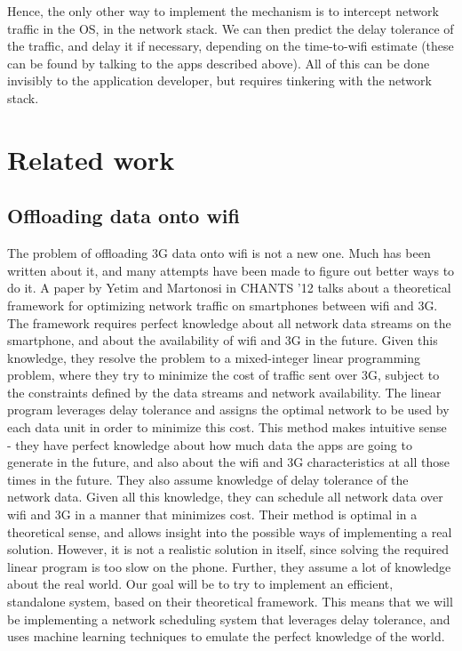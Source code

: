 \documentclass[12pt, fleqn]{article}
\begin{document}
\begin{itemize}
  Hence, the only other way to implement the mechanism is to intercept network 
  traffic in the OS, in the network stack. We can then predict the delay 
  tolerance of the traffic, and delay it if necessary, depending on the 
  time-to-wifi estimate (these can be found by talking to the apps described above). 
  All of this can be done invisibly to the application 
  developer, but requires tinkering with the network stack. 
\end{itemize}


\section{Related work}
\label{related-work}

\subsection{Offloading data onto wifi}
\label{related-work-offload}

The problem of offloading 3G data onto wifi is not a new one. Much has been 
written about it, and many attempts have been made to figure out better ways to 
do it. A paper by Yetim and Martonosi in CHANTS '12 talks about a 
theoretical framework for optimizing network traffic on smartphones between wifi 
and 3G. The framework requires perfect knowledge about all network data streams on the
smartphone, and about the availability of wifi and 3G in the future. Given this 
knowledge, they resolve the problem to a mixed-integer linear programming 
problem, where they try to minimize the cost of traffic sent over 3G, subject to 
the constraints defined by the data streams and network availability. The linear program 
leverages delay tolerance and assigns the optimal network to be used by each data unit in order to minimize 
this cost.\cite{ozlem-2012} This method makes intuitive sense - they have  
perfect knowledge about how much data the apps are going to generate in the future, and 
also about the wifi and 3G characteristics at all those times in the future. 
They also assume knowledge of delay tolerance of the network data. Given all 
this knowledge, they can schedule all network data over wifi and 3G in a manner 
that minimizes cost. Their method is optimal in a theoretical sense, and allows 
insight into the possible ways of implementing a real solution. However, it is 
not a realistic solution in itself, since solving the required linear program
is too slow on the phone. Further, they assume a lot of knowledge about the real 
world. Our goal will be to try to implement an efficient, standalone 
system, based on their theoretical framework. This means that we will be 
implementing a network scheduling system that leverages delay tolerance, and 
uses machine learning techniques to emulate the perfect knowledge of the world. 
\end{document}
